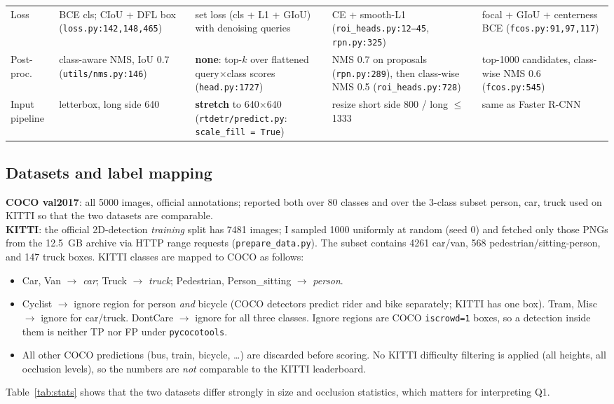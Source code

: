 \documentclass[10pt]{article}
\newcommand{\code}[1]{\texttt{\small #1}}
\begin{document}
\begin{table}[h]
\begin{tabular}{@{}R{1.45cm}R{3.55cm}R{3.55cm}R{3.7cm}R{3.1cm}@{}}
Loss & BCE cls; CIoU + DFL box (\code{loss.py:142,148,465}) & set loss (cls + L1 + GIoU) with denoising queries & CE + smooth-L1 (\code{roi\_heads.py:12--45}, \code{rpn.py:325}) & focal + GIoU + centerness BCE (\code{fcos.py:91,97,117}) \\
Post-proc. & class-aware NMS, IoU 0.7 (\code{utils/nms.py:146}) & \textbf{none}: top-$k$ over flattened query$\times$class scores (\code{head.py:1727}) & NMS 0.7 on proposals (\code{rpn.py:289}), then class-wise NMS 0.5 (\code{roi\_heads.py:728}) & top-1000 candidates, class-wise NMS 0.6 (\code{fcos.py:545}) \\
Input pipeline & letterbox, long side 640 & \textbf{stretch} to 640$\times$640 (\code{rtdetr/predict.py}: \code{scale\_fill = True}) & resize short side 800 / long $\le$1333 & same as Faster R-CNN \\
\bottomrule
\end{tabular}
\end{table}

\subsection{Datasets and label mapping}
\textbf{COCO val2017}: all 5000 images, official annotations; reported both over 80 classes and over the 3-class subset {person, car, truck} used on KITTI so that the two datasets are comparable.\\
\textbf{KITTI}: the official 2D-detection \emph{training} split has 7481 images; I sampled 1000 uniformly at random (seed 0) and fetched only those PNGs from the 12.5~GB archive via HTTP range requests (\code{prepare\_data.py}). The subset contains 4261 car/van, 568 pedestrian/sitting-person, and 147 truck boxes. KITTI classes are mapped to COCO as follows:
\begin{itemize}
\item Car, Van $\rightarrow$ \emph{car}; Truck $\rightarrow$ \emph{truck}; Pedestrian, Person\_sitting $\rightarrow$ \emph{person}.
\item Cyclist $\rightarrow$ ignore region for person \emph{and} bicycle (COCO detectors predict rider and bike separately; KITTI has one box). Tram, Misc $\rightarrow$ ignore for car/truck. DontCare $\rightarrow$ ignore for all three classes. Ignore regions are COCO \code{iscrowd=1} boxes, so a detection inside them is neither TP nor FP under \code{pycocotools}.
\item All other COCO predictions (bus, train, bicycle, \dots) are discarded before scoring. No KITTI difficulty filtering is applied (all heights, all occlusion levels), so the numbers are \emph{not} comparable to the KITTI leaderboard.
\end{itemize}
Table~\ref{tab:stats} shows that the two datasets differ strongly in size and occlusion statistics, which matters for interpreting Q1.
\end{document}
